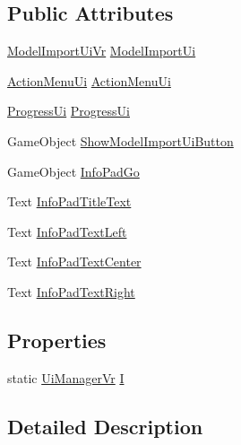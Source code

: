 \subsection*{Public Attributes}
\begin{DoxyCompactItemize}
\item 
\mbox{\hyperlink{class_model_import_ui_vr}{Model\+Import\+Ui\+Vr}} \mbox{\hyperlink{class_ui_manager_vr_af9706465d734c91ff22a586b7e754d52}{Model\+Import\+Ui}}
\item 
\mbox{\hyperlink{class_action_menu_ui}{Action\+Menu\+Ui}} \mbox{\hyperlink{class_ui_manager_vr_abda753d4ff4fd97f4e0fef471cd3d640}{Action\+Menu\+Ui}}
\item 
\mbox{\hyperlink{class_progress_ui}{Progress\+Ui}} \mbox{\hyperlink{class_ui_manager_vr_a871729ea346c10fe7300e09166b244d7}{Progress\+Ui}}
\item 
Game\+Object \mbox{\hyperlink{class_ui_manager_vr_a31765177746a67199f2d6cfe7afe49e5}{Show\+Model\+Import\+Ui\+Button}}
\item 
Game\+Object \mbox{\hyperlink{class_ui_manager_vr_a7f1d4ca2de27fc39b82a37227e5057a3}{Info\+Pad\+Go}}
\item 
Text \mbox{\hyperlink{class_ui_manager_vr_af61e7d3f15782b2eb08bb45a707c23ea}{Info\+Pad\+Title\+Text}}
\item 
Text \mbox{\hyperlink{class_ui_manager_vr_af7bded7725537d18fbedd5b822a81426}{Info\+Pad\+Text\+Left}}
\item 
Text \mbox{\hyperlink{class_ui_manager_vr_a975a64404efb1fe598661394f9860d00}{Info\+Pad\+Text\+Center}}
\item 
Text \mbox{\hyperlink{class_ui_manager_vr_a92fcb7893989cedb289ac8db08a980e3}{Info\+Pad\+Text\+Right}}
\end{DoxyCompactItemize}
\subsection*{Properties}
\begin{DoxyCompactItemize}
\item 
static \mbox{\hyperlink{class_ui_manager_vr}{Ui\+Manager\+Vr}} \mbox{\hyperlink{class_ui_manager_vr_afa03015a546e379de97b902462ae57cf}{I}}
\end{DoxyCompactItemize}


\subsection{Detailed Description}


